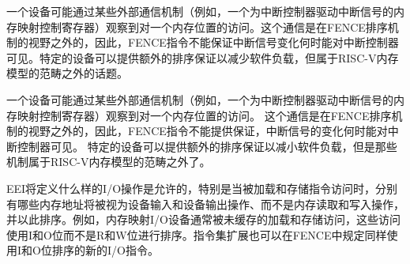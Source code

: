 \begin{commentary}

  一个设备可能通过某些外部通信机制（例如，一个为中断控制器驱动中断信号的内存映射控制寄存器）观察到对一个内存位置的访问。这个通信是在FENCE排序机制的视野之外的，因此，FENCE指令不能保证中断信号变化何时能对中断控制器可见。特定的设备可以提供额外的排序保证以减少软件负载，但属于RISC-V内存模型的范畴之外的话题。

一个设备可能通过某些外部通信机制（例如，一个为中断控制器驱动中断信号的内存映射控制寄存器）观察到对一个内存位置的访问。
这个通信是在FENCE排序机制的视野之外的，因此，FENCE指令不能提供保证，中断信号的变化何时能对中断控制器可见。
特定的设备可以提供额外的排序保证以减小软件负载，但是那些机制属于RISC-V内存模型的范畴之外了。
\end{commentary}

EEI将定义什么样的I/O操作是允许的，特别是当被加载和存储指令访问时，分别有哪些内存地址将被视为设备输入和设备输出操作、而不是内存读取和写入操作，并以此排序。例如，内存映射I/O设备通常被未缓存的加载和存储访问，这些访问使用I和O位而不是R和W位进行排序。指令集扩展也可以在FENCE中规定同样使用I和O位排序的新的I/O指令。



